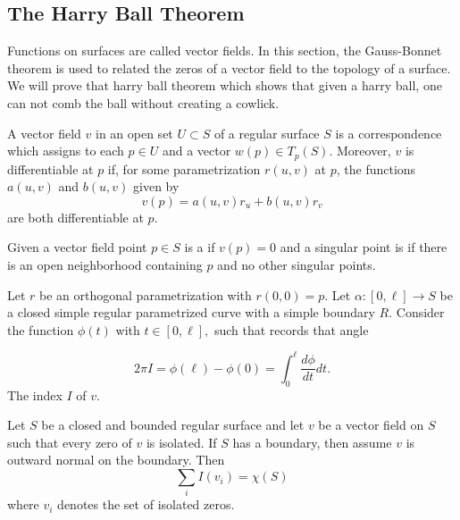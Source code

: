 \subsection{The Harry Ball Theorem}
\label{sec:harry-ball}

Functions on surfaces are called vector fields.
In this section, the Gauss-Bonnet theorem is used
to related the zeros of a vector field to the topology of a surface.
We will prove that harry ball theorem which shows that 
given a harry ball, one
can not comb the ball without creating a cowlick.




\begin{definition}\label{def:vector-field}
	A vector field $v$  in an open set $U\subset S$ of a regular surface $S$
	is a correspondence which assigns to each $p\in U$ and a vector $w(p)\in T_p(S)$.
	Moreover, $v$ is differentiable at $p$ if, for some parametrization $r(u,v)$ at $p$,
	the functions $a(u,v)$ and $b(u,v)$ given by
		$$v(p)=a(u,v)r_u + b(u,v)r_v$$
	are both differentiable at $p$.
\end{definition}

Given a vector field point $p\in S$ is a  if $v(p)=0$
and a singular point is  if there is an open neighborhood
containing $p$ and no other singular points.



\begin{definition}[Index]\label{def:index}
Let $r$ be an orthogonal parametrization with $r(0,0)=p.$
Let $\alpha:[0,\ell]\to S$ be a closed simple regular parametrized curve with a 
simple boundary $R$.
Consider the function $\phi(t)$ with $t\in [0,\ell],$ such that records that angle 

$$2\pi I=\phi(\ell)-\phi(0)=\int_0^\ell \frac{d\phi}{dt}dt.$$
	The index $I$ of $v$.
\end{definition}



\begin{theorem}\label{thm:poincare-hopf}
	Let $S$ be a closed and bounded regular surface and let $v$ be a vector field
	on $S$ such that every zero of $v$ is isolated. If $S$ has a boundary, 
	then assume $v$ is outward normal on the boundary. Then
	$$\sum_iI(v_i)=\chi(S)$$
	where $v_i$ denotes the set of isolated zeros.
	
\end{theorem}
\cite{rotskoff2010}